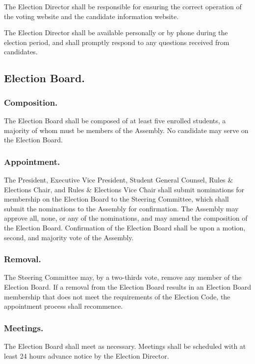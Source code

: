 \subsubsubsection{}
The Election Director shall be responsible for ensuring the correct operation of the voting website and the candidate information website.

\subsubsubsection{}
The Election Director shall be available personally or by phone during the election period, and shall promptly respond to any questions received from candidates.


\subsection{Election Board.}

\subsubsection{Composition.}
The Election Board shall be composed of at least five enrolled students, a majority of whom must be members of the Assembly.  No candidate may serve on the Election Board.  

\subsubsection{Appointment.}
The President, Executive Vice President, Student General Counsel, Rules \& Elections Chair, and Rules \& Elections Vice Chair shall submit nominations for membership on the Election Board to the Steering Committee, which shall submit the nominations to the Assembly for confirmation.  The Assembly may approve all, none, or any of the nominations, and may amend the composition of the Election Board.  Confirmation of the Election Board shall be upon a motion, second, and majority vote of the Assembly.

\subsubsection{Removal.}
The Steering Committee may, by a two-thirds vote, remove any member of the Election Board.  If a removal from the Election Board results in an Election Board membership that does not meet the requirements of the Election Code, the appointment process shall recommence.

\subsubsection{Meetings.}
The Election Board shall meet as necessary.  Meetings shall be scheduled with at least 24 hours advance notice by the Election Director.

